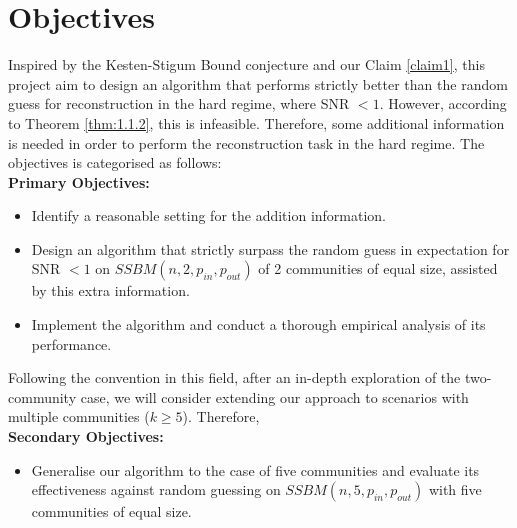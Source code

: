 \section{Objectives}
Inspired by the Kesten-Stigum Bound conjecture and our Claim \ref{claim1}, this project aim to design an algorithm that performs strictly better than the random guess for reconstruction in the hard regime, where SNR $<1$. However, according to Theorem \ref{thm:1.1.2}, this is infeasible. Therefore, some additional information is needed in order to perform the reconstruction task in the hard regime. The objectives is categorised as follows:\vspace{2mm}\\
\textbf{Primary Objectives:}
\begin{itemize}
    \item Identify a reasonable setting for the addition information.
    \item Design an algorithm that strictly surpass the random guess in expectation for SNR $<1$ on $SSBM(n, 2, p_{in}, p_{out})$ of 2 communities of equal size, assisted by this extra information.
    \item Implement the algorithm and conduct a thorough empirical analysis of its performance.
\end{itemize}
Following the convention in this field, after an in-depth exploration of the two-community case, we will consider extending our approach to scenarios with multiple communities ($k \geq 5$). Therefore,\vspace{2mm}\\
\textbf{Secondary Objectives:}
\begin{itemize}
    \item Generalise our algorithm to the case of five communities and evaluate its effectiveness against random guessing on $SSBM(n, 5, p_{in}, p_{out})$ with five communities of equal size.
\end{itemize}
